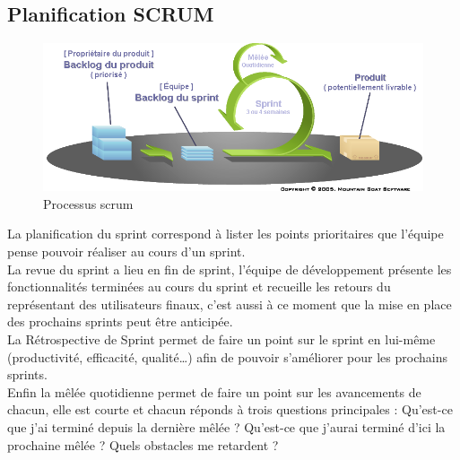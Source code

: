 \subsection{Planification SCRUM}
\begin{figure}[h]
  \includegraphics[width=\linewidth]{Images/scrum.png}
  \caption{Processus scrum}
  \label{fig:scrum}
\end{figure}
La planification du sprint correspond à lister les points prioritaires que l'équipe
pense pouvoir réaliser au cours d'un sprint.\\[0.2cm]
La revue du sprint a lieu en fin de sprint, l'équipe de développement présente les
fonctionnalités terminées au cours du sprint et recueille les retours du représentant des
utilisateurs finaux, c'est aussi à ce moment que la mise en place des prochains sprints peut être
anticipée.\\[0.2cm]
La Rétrospective de Sprint permet de faire un point sur le sprint en lui-même (productivité, efficacité, qualité…) afin de pouvoir s'améliorer pour les prochains sprints.\\[0.2cm]
Enfin la mêlée quotidienne permet de faire un point sur les avancements de chacun,
elle est courte et chacun réponds à trois questions principales : Qu'est-ce que j'ai terminé
depuis la dernière mêlée ? Qu'est-ce que j'aurai terminé d'ici la prochaine mêlée ? Quels
obstacles me retardent ?
